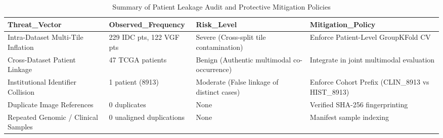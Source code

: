 \begin{table}
\caption{Summary of Patient Leakage Audit and Protective Mitigation Policies}
\label{tab:table_leakage_analysis_summary}
\begin{tabular}{llll}
\toprule
Threat\_Vector & Observed\_Frequency & Risk\_Level & Mitigation\_Policy \\
\midrule
Intra-Dataset Multi-Tile Inflation & 229 IDC pts, 122 VGF pts & Severe (Cross-split tile contamination) & Enforce Patient-Level GroupKFold CV \\
Cross-Dataset Patient Linkage & 47 TCGA patients & Benign (Authentic multimodal co-occurrence) & Integrate in joint multimodal evaluation \\
Institutional Identifier Collision & 1 patient (8913) & Moderate (False linkage of distinct cases) & Enforce Cohort Prefix (CLIN\_8913 vs HIST\_8913) \\
Duplicate Image References & 0 duplicates & None & Verified SHA-256 fingerprinting \\
Repeated Genomic / Clinical Samples & 0 unaligned duplications & None & Manifest sample indexing \\
\bottomrule
\end{tabular}
\end{table}
